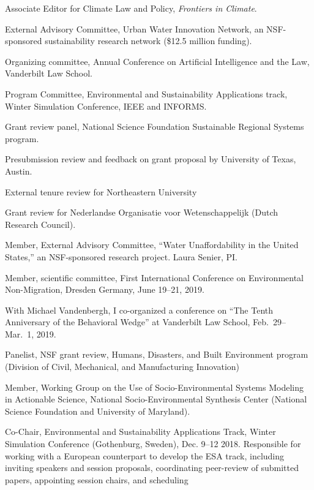 \item[2021--present] Associate Editor for Climate Law and Policy,
   \emph{Frontiers in Climate}.
\item[2016--present] External Advisory Committee,
  Urban Water Innovation Network, an NSF-sponsored sustainability
  research network (\$12.5 million funding).
\item[2016--present] Organizing committee,
  Annual Conference on Artificial Intelligence and the Law,
  Vanderbilt Law School.
\item[2016--present] Program Committee,
  Environmental and Sustainability Applications track,
  Winter Simulation Conference, IEEE and INFORMS.
\item[2022] Grant review panel, National Science Foundation Sustainable
Regional Systems program.
\item[2022] Presubmission review and feedback on grant proposal by
  University of Texas, Austin.
\item[2021] External tenure review for Northeastern University
\item[2021] Grant review for Nederlandse Organisatie voor Wetenschappelijk
  (Dutch Research Council).
\item[2019--2021] Member, External Advisory Committee,
  ``Water Unaffordability in the United States,''
  an NSF-sponsored research project. Laura Senier, PI.
\item[2019] Member, scientific committee,
  First International Conference on Environmental Non-Migration,
  Dresden Germany, June 19--21, 2019.
\item[2019] With Michael Vandenbergh, I co-organized a conference on
  ``The Tenth Anniversary of the Behavioral Wedge'' at Vanderbilt Law School,
   Feb.~29--Mar.~1, 2019.
\item[2018] Panelist, NSF grant review,
  Humans, Disasters, and Built Environment program
  (Division of Civil, Mechanical, and Manufacturing Innovation)
\item[2018] Member, Working Group on the Use of Socio-Environmental Systems
  Modeling in Actionable Science,
  National Socio-Environmental Synthesis Center
  (National Science Foundation and University of Maryland).
\item[2018] Co-Chair, Environmental and Sustainability Applications Track,
   Winter Simulation Conference (Gothenburg, Sweden), Dec. 9--12 2018.
   Responsible for working with a European counterpart to develop the ESA
   track, including inviting speakers and session proposals, coordinating
   peer-review of submitted papers, appointing session chairs, and scheduling
